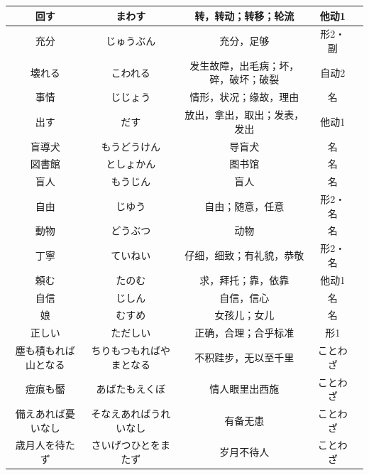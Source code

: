 \begin{longtable}{|c|c|c|c|c|}
    回す & まわす & 转，转动；转移；轮流 & 他动1 & \\ \hline
    充分 & じゅうぶん & 充分，足够 & 形2・副 & \\ \hline
    壊れる & こわれる & 发生故障，出毛病；坏，碎，破坏；破裂 & 自动2 & \\ \hline
    事情 & じじょう & 情形，状况；缘故，理由 & 名 & \\ \hline
    出す & だす & 放出，拿出，取出；发表，发出 & 他动1 & \\ \hline
    盲導犬 & もうどうけん & 导盲犬 & 名 & \\ \hline
    図書館 & としょかん & 图书馆 & 名 & \\ \hline
    盲人 & もうじん & 盲人 & 名 & \\ \hline
    自由 & じゆう & 自由；随意，任意 & 形2・名 & \\ \hline
    動物 & どうぶつ & 动物 & 名 & \\ \hline
    丁寧 & ていねい & 仔细，细致；有礼貌，恭敬 & 形2・名 & \\ \hline
    頼む & たのむ & 求，拜托；靠，依靠 & 他动1 & \\ \hline
    自信 & じしん & 自信，信心 & 名 & \\ \hline
    娘 & むすめ & 女孩儿；女儿 & 名 & \\ \hline
    正しい & ただしい & 正确，合理；合乎标准 & 形1 & \\ \hline
    塵も積もれば山となる & ちりもつもればやまとなる & 不积跬步，无以至千里 & ことわざ & \\ \hline
    痘痕も靨 & あばたもえくぼ & 情人眼里出西施 & ことわざ & \\ \hline
    備えあれば憂いなし & そなえあればうれいなし & 有备无患 & ことわざ & \\ \hline
    歳月人を待たず & さいげつひとをまたず & 岁月不待人 & ことわざ & \\ \hline
\end{longtable}

